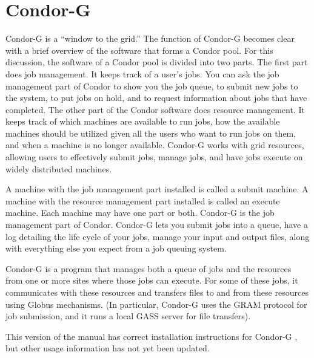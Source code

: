 
\section{\label{sec:Condor-G}Condor-G}

Condor-G is a ``window to the grid.''
The function of Condor-G becomes clear
with a brief overview of the software that forms a Condor pool.
For this discussion, the software of a Condor pool is divided
into two parts.
The first part does job management.
It keeps track of a user's jobs.
You can ask the job management part of Condor to show
you the job queue, to submit new jobs to the system,
to put jobs on hold,
and to request information about jobs that have completed.
The other part of the Condor software
does resource management.
It keeps track of which machines are available to run jobs,
how the available machines should be utilized given all the users
who want to run jobs on them,
and when a machine is no longer available.
Condor-G works with grid resources, allowing users to
effectively submit jobs, manage jobs, and have jobs execute
on widely distributed machines.

A machine with the job management part installed
is called a submit machine.
A machine with the resource management part installed 
is called an execute machine.
Each machine may have one part or both.
Condor-G is the job management part of Condor.
Condor-G lets you submit jobs into a queue,
have a log detailing the life cycle of your jobs,
manage your input and output files,
along with everything else you expect from a job queuing system.

Condor-G is a program that manages both a queue of jobs
and the resources from one or more sites where those jobs can execute. 
For some of these jobs,
it communicates with these resources and transfers files
to and from these resources using Globus mechanisms.
(In particular, Condor-G uses the GRAM protocol for job submission,
and it runs a local GASS server for file transfers).

\Note This version of the manual has correct installation instructions
for Condor-G \VersionNotice, but other usage information has not
yet been updated.






%



